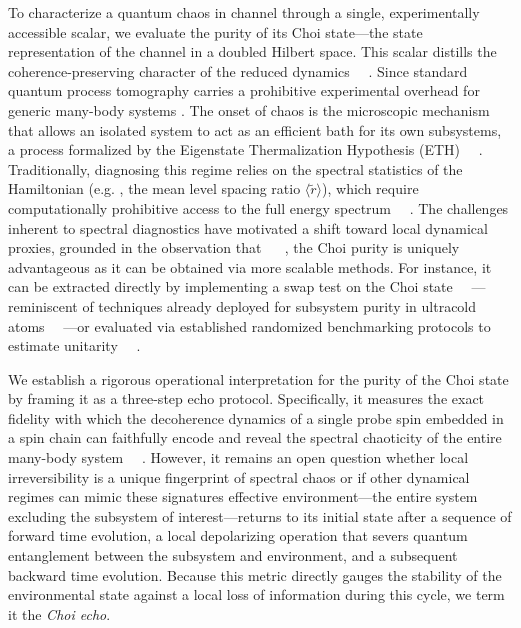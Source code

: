 \documentclass[pra,twocolumn,aps,showpacs,superscriptaddress,longbibliography]{revtex4-2}%
\providecommand{\DIFadd}[1]{{\protect\color{blue} \sf #1}} %
\providecommand{\DIFdel}[1]{{\protect\color{red} \scriptsize #1}} %
\providecommand{\DIFaddbegin}{} %
\providecommand{\DIFaddend}{} %
\providecommand{\DIFdelbegin}{} %
\providecommand{\DIFdelend}{} %
\begin{document}
\DIFadd{To characterize a }\DIFaddend quantum \DIFdelbegin \DIFdel{chaos in }\DIFdelend \DIFaddbegin \DIFadd{channel through a single, experimentally accessible scalar, we evaluate the purity of its Choi state---the state representation of the channel in a doubled Hilbert space. This scalar distills the coherence-preserving character of the reduced dynamics~\mbox{%
\cite{wallman_2015_estimating}}\hskip0pt%
. Since standard quantum process tomography carries a prohibitive experimental overhead for generic }\DIFaddend many-body systems\DIFdelbegin \DIFdel{. The onset of chaos is the microscopic mechanism that allows an isolated system to act as an efficient bath for its own subsystems, a process formalized by the Eigenstate Thermalization Hypothesis (ETH)~\mbox{%
\cite{deutsch_1991_quantum, dalessio_2016_quantum}}\hskip0pt%
.
Traditionally, diagnosing this regime relies on the spectral statistics of the Hamiltonian (e.g. , the mean level spacing ratio $\langle \tilde{r} \rangle$), which require computationally prohibitive access to the full energy spectrum~\mbox{%
\cite{bohigas_1984_characterization, scialchi_2024_integrabilitytochaos}}\hskip0pt%
. The challenges inherent to spectral diagnostics have motivated a shift toward local dynamical proxies, grounded in the observation that }\DIFdelend \DIFaddbegin \DIFadd{~\mbox{%
\cite{huang_2020_predicting}}\hskip0pt%
, the Choi purity is uniquely advantageous as it can be obtained via more scalable methods. For instance, it can be extracted directly by implementing a swap test on the Choi state~\mbox{%
\cite{rosgen_2010_testing,yuan_2021_universal}}\hskip0pt%
---reminiscent of techniques already deployed for subsystem purity in ultracold atoms~\mbox{%
\cite{islam_2015_measuring, kaufman_2016_quantum}}\hskip0pt%
---or evaluated via established randomized benchmarking protocols to estimate unitarity~\mbox{%
\cite{wallman_2015_estimating}}\hskip0pt%
.
}

\DIFadd{We establish a rigorous operational interpretation for the purity of the Choi state by framing it as a three-step echo protocol. Specifically, it measures the exact fidelity with which }\DIFaddend the \DIFdelbegin \DIFdel{decoherence dynamics of a single probe spin embedded in a spin chain can faithfully encode and reveal the spectral chaoticity of the entire many-body system~\mbox{%
\cite{borgonovi_2025_timescales, mirkin_2021_quantum}}\hskip0pt%
.
However, it remains an open question whether local irreversibility is a unique fingerprint of spectral chaos or if other dynamical regimes can mimic these signatures}\DIFdelend \DIFaddbegin \DIFadd{effective environment---the entire system excluding the subsystem of interest---returns to its initial state after a sequence of forward time evolution, a local depolarizing operation that severs quantum entanglement between the subsystem and environment, and a subsequent backward time evolution. Because this metric directly gauges the stability of the environmental state against a local loss of information during this cycle, we term it the }\textit{\DIFadd{Choi echo}}\DIFaddend .
\end{document}
